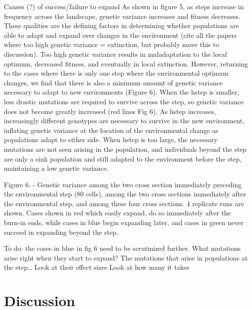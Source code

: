Causes (?) of success/failure to expand
As shown in figure 5, as steps increase in frequency across the landscape, genetic variance 
increases and fitness decreases. These qualities are the defining factors in determining whether 
populations are able to adapt and expand over changes in the environment (cite all the papers 
where too high genetic variance = extinction, but probably move this to discussion). Too high 
genetic variance results in maladaptation to the local optimum, decreased fitness, and eventually 
in local extinction. However, returning to the cases where there is only one step where the 
environmental optimum changes, we find that there is also a minimum amount of genetic variance 
necessary to adapt to new environments (Figure 6). When the hstep is smaller, less drastic 
mutations are required to survive across the step, so genetic variance does not become greatly 
increased (red lines Fig 6). As hstep increases, increasingly different genotypes are necessary 
to survive in the new environment, inflating genetic variance at the location of the environmental 
change as populations adapt to either side. When hstep is too large, the necessary mutations are 
not seen arising in the population, and individuals beyond the step are only a sink population 
and still adapted to the environment before the step, maintaining a low genetic variance.

Figure 6. - Genetic variance among the two cross section immediately preceding the environmental 
step (80 cells), among the two cross sections immediately after the environmental step, and 
among these four cross sections. 4 replicate runs are shown. Cases shown in red which easily 
expand, do so immediately after the burn-in ends, while cases in blue begin expanding later, 
and cases in green never succeed in expanding beyond the step.

To do: the cases in blue in fig 6 need to be scrutinized further. What mutations arise 
right when they start to expand?
	The mutations that arise in populations at the step…
		Look at their effect sizes
		Look at how many it takes




\section{Discussion}

